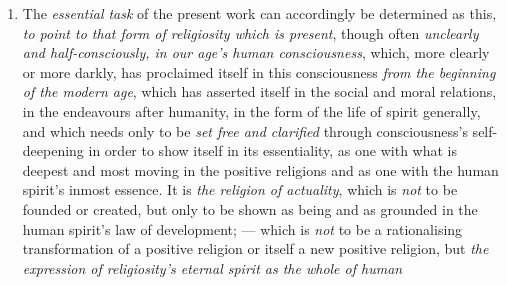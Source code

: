 \documentclass[12pt,a4paper]{book}
\begin{document}
\begin{enumerate}[label=\arabic*., leftmargin=*, labelsep=1em,
                  topsep=0.35\baselineskip, itemsep=0.35\baselineskip]
  is lived in \emph{every} essential form of spirit's life, and has its
  \emph{positive} expression in these forms of life, so that the religious
  relation becomes an \emph{absolute} relation, comprehending the \emph{whole}
  of life, and connecting the human spirit with its \emph{essential} Absolute,
  with \emph{the in truth infinite}. And in this unity is, with the
  \emph{absolute relation} and with \emph{reconciliation}, --- spirit's
  reconciliation with \emph{its principle} and in \emph{its own inner being},
  --- \emph{what is essential in the positive religions} preserved, while the
  historical form is dissolved, the transcendence of representation abolished in
  the relation of immanence in which transcendence becomes a moment.

\item The \emph{essential task} of the present work can accordingly be
  determined as this, \emph{to point to that form of religiosity which is
  present}, though often
  \emph{unclearly and half-consciously, in our age's human consciousness},
  which, more clearly or more darkly, has proclaimed itself in this
  consciousness \emph{from the beginning of the modern age}, which has asserted
  itself in the social and moral relations, in the endeavours after humanity, in
  the form of the life of spirit generally, and which needs only to be \emph{set
  free and clarified} through consciousness's self-deepening in order to show
  itself in its essentiality, as one with what is deepest and most moving in the
  positive religions and as one with the human spirit's inmost essence. It is
  \emph{the religion of actuality}, which is \emph{not} to be founded or
  created, but only to be shown as being and as grounded in the human spirit's
  law of development; --- which is \emph{not} to be a rationalising
  transformation of a positive religion or itself a new positive religion, but
  \emph{the expression of religiosity's eternal spirit as the whole of human
}
\end{enumerate}
\end{document}
